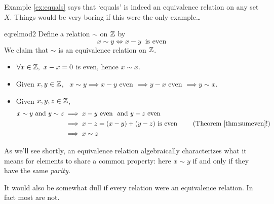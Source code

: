
\smallbreak

Example \ref{ex:equals} says that `equals' is indeed an equivalence relation on any set $X$. Things would be very boring if this were the only example\ldots


\begin{example}{}{eqrelmod2}
	Define a relation $\sim$ on $\mathbb{Z}$ by
	\[
		x\sim y\iff x-y\ \text{ is even} \tag{otherwise said, $x\equiv y\spmod 2$}
	\]
	We claim that $\sim$ is an equivalence relation on $\mathbb{Z}$.
	\begin{itemize}
		\item[] $\forall x\in\mathbb{Z},\ x-x=0$ is even, hence $x\sim x$.
		\item[]\eqsymm Given $x,y\in\mathbb{Z}$, \ $x\sim y\implies x-y$ even $\implies y-x$ even $\implies y\sim x$.
		\item[]\eqtrans Given $x,y,z\in\mathbb{Z}$,
		\begin{align*}
			x\sim y \text{ and } y\sim z&\implies x-y\text{ even \ and }y-z\text{ even }\\
			&\implies x-z=(x-y)+(y-z)\text{ is even } \tag{Theorem \ref{thm:sumeven}!}\\
			&\implies x\sim z
		\end{align*}
	\end{itemize}
As we'll see shortly, an equivalence relation algebraically characterizes what it means for elements to share a common property: here $x\sim y$ if and only if they have the same \emph{parity.}
\end{example}

\goodbreak


It would also be somewhat dull if every relation were an equivalence relation. In fact most are not.

